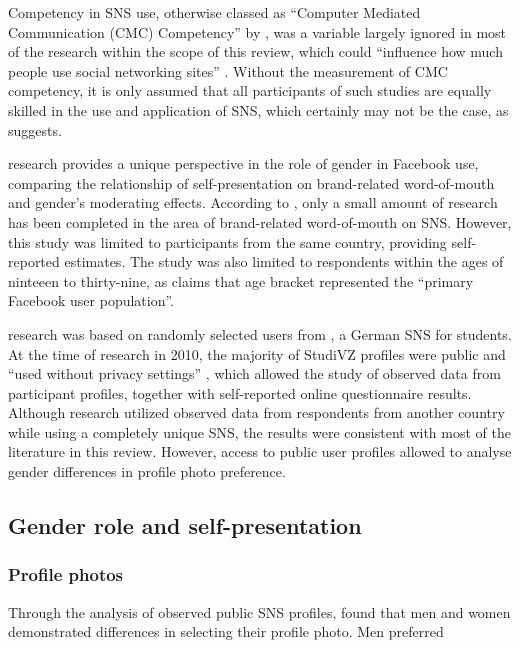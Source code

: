 Competency in SNS use, otherwise classed as ``Computer Mediated Communication (CMC) Competency'' by \citet[p. 579]{Ross2009}, was a variable largely ignored in most of the research within the scope of this review, which could ``influence how much people use social networking sites'' \citep[p. 898]{Kimbrough2013}. Without the measurement of CMC competency, it is only assumed that all participants of such studies are equally skilled in the use and application of SNS, which certainly may not be the case, as \citet{Ross2009} suggests.

 research provides a unique perspective in the role of gender in Facebook use, comparing the relationship of self-presentation on brand-related word-of-mouth and gender's moderating effects. According to \citet{Choi2014}, only a small amount of research has been completed in the area of brand-related word-of-mouth on SNS. However, this study was limited to participants from the same country, providing self-reported estimates. The study was also limited to respondents within the ages of ninteeen to thirty-nine, as \citet[p. 3]{Choi2014} claims that age bracket represented the ``primary Facebook user population''.

 research was based on randomly selected users from \citet{StudiVZ2014}, a German SNS for students. At the time of research in 2010, the majority of StudiVZ profiles were public and ``used without privacy settings'' \citep[p. 92]{Haferkamp2012}, which allowed the study of observed data from participant profiles, together with self-reported online questionnaire results. Although  research utilized observed data from respondents from another country while using a completely unique SNS, the results were consistent with most of the literature in this review. However, access to public user profiles allowed \citet{Haferkamp2012} to analyse gender differences in profile photo preference.

\subsection{Gender role and self-presentation}
\subsubsection{Profile photos}

Through the analysis of observed public SNS profiles, \citet{Haferkamp2012} found that men and women demonstrated differences in selecting their profile photo. Men preferred 
